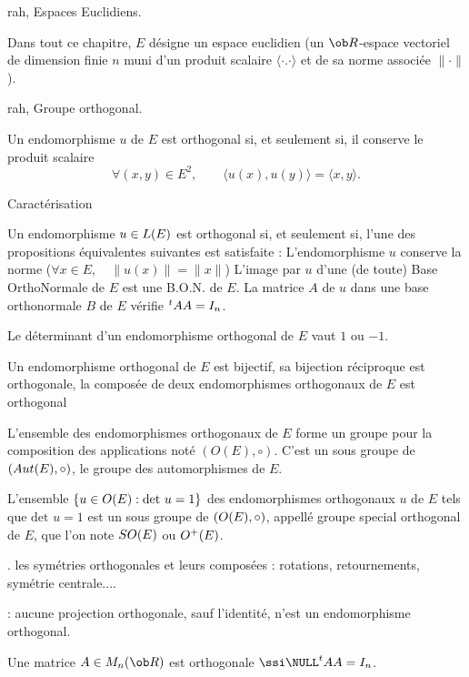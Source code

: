 \Section rah, Espaces Euclidiens. 

Dans tout ce chapitre, $E$ désigne un espace euclidien 
(un $\ob R$-espace vectoriel de dimension finie $n$ 
muni d'un produit scalaire $\langle\cdot.\cdot\rangle$ 
et de sa norme associée $\|\cdot\|$).
\bigskip

\Subsection rah, Groupe orthogonal. 

Un endomorphisme $u$ de $E$ est orthogonal si, et seulement si, il conserve le produit scalaire
$$
\forall (x,y)\in E^2, \qquad \langle u(x),u(y)\rangle=\langle x,y\rangle.
$$

\Concept Caractérisation

Un endomorphisme $u\in\sc L(E)$ est orthogonal si, et seulement si, 
l'une des propositions é\-qui\-va\-len\-tes suivantes est satisfaite : \medskip\noindent
L'endomorphisme $u$ conserve la norme ($\forall x\in E, \quad \|u(x)\|=\|x\|$) \medskip\noindent
L'image par $u$ d'une (de toute) Base OrthoNormale de $E$
est une B.O.N. de $E$. \medskip\noindent
La matrice $A$ de $u$ dans une base orthonormale $B$ de $E$ vérifie $\null^tAA=I_n$. 

Le déterminant d'un endomorphisme orthogonal de $E$ vaut $1$ ou $-1$. 

Un endomorphisme orthogonal de $E$ est bijectif, 
sa bijection réciproque est orthogonale, 
la composée de deux endomorphismes orthogonaux de $E$ est orthogonal

L'ensemble des endomorphismes orthogonaux de $E$ forme un groupe pour la composition des applications noté $(O(E),\circ)$. 
C'est un sous groupe de $({\sc Aut}(E),\circ)$, le groupe des automorphismes de $E$. 

L'ensemble $\{u\in \sc O(E):\mbox{det\ }u=1\}$ 
des endomorphismes orthogonaux $u$ de $E$ tels que $\mbox{det\ }u=1$ 
est un sous groupe de $(\sc O(E),\circ)$, appellé groupe special orthogonal de $E$, 
que l'on note ${\sc SO}(E)$ ou $\sc O^+(E)$. 

\Exemple. les symétries orthogonales et leurs composées : rotations, 
retournements, symétrie centrale....
\bigskip

\Remarque : aucune projection orthogonale, sauf l'identité, n'est un endomorphisme orthogonal. 

\Definition [$n\ge1$] 
Une matrice $A\in\sc M_n(\ob R)$ est orthogonale $\ssi\NULL^tAA=I_n$. 

